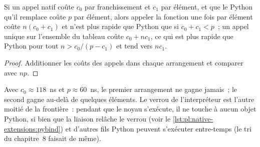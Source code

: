 \begin{omfigure}

\label{fig:pl:native-extensions:calls}
\end{omfigure}

\begin{proposition}\label{prop:pl:native-extensions:loop}
Si un appel natif coûte $c_0$ par franchissement et $c_1$ par élément, et que le Python qu'il remplace coûte $p$ par élément, alors appeler la fonction
une fois par élément coûte $n(c_0 + c_1)$ et n'est plus rapide que Python que si $c_0 + c_1 < p$~; un appel unique sur l'ensemble du tableau coûte
$c_0 + n c_1$, ce qui est plus rapide que Python pour tout $n > c_0/(p - c_1)$ et tend vers $n c_1$.
\end{proposition}

\begin{proof}
Additionner les coûts des appels dans chaque arrangement et comparer avec $np$.
\end{proof}

Avec $c_0 \approx 118$~ns et $p \approx 60$~ns, le premier arrangement ne gagne jamais~; le second gagne au-delà de quelques éléments. Le
verrou de l'interpréteur est l'autre moitié de la frontière~: pendant que le noyau s'exécute, il ne touche à aucun objet Python, si bien que la liaison relâche le verrou
(voir le \cref{lst:pl:native-extensions:pybind}) et d'autres fils Python peuvent s'exécuter entre-temps (le tri du chapitre~8 faisait de même).

